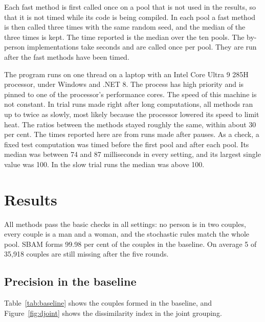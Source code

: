 \documentclass[12pt,a4paper]{article}
\begin{document}
Each fast method is first called once on a pool that is not used in the results, so that it is
not timed while its code is being compiled. In each pool a fast method is then called three times
with the same random seed, and the median of the three times is kept. The time reported is the
median over the ten pools. The by-person implementations take seconds and are called once per
pool. They are run after the fast methods have been timed.

The program runs on one thread on a laptop with an Intel Core Ultra 9 285H processor, under
Windows and .NET 8. The process has high priority and is pinned to one of the processor's
performance cores. The speed of this machine is not constant. In trial runs made right after long
computations, all methods ran up to twice as slowly, most likely because the processor lowered
its speed to limit heat. The ratios between the methods stayed roughly the same, within about 30
per cent. The times reported here are from runs made after pauses. As a check, a fixed test
computation was timed before the first pool and after each pool. Its median was between 74 and
87 milliseconds in every setting, and its largest single value was 100. In the slow trial runs
the median was above 100.

\section{Results}\label{sec:results}

All methods pass the basic checks in all settings: no person is in two couples, every couple is a
man and a woman, and the stochastic rules match the whole pool. SBAM forms 99.98 per cent of the
couples in the baseline. On average 5 of 35,918 couples are still missing after the five rounds.

\subsection{Precision in the baseline}

Table~\ref{tab:baseline} shows the couples formed in the baseline, and Figure~\ref{fig:djoint}
shows the dissimilarity index in the joint grouping.
\end{document}
